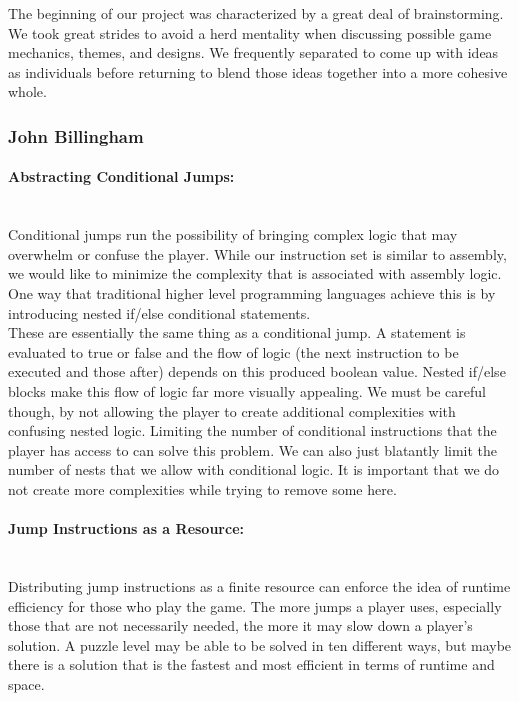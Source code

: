The beginning of our project was characterized by a great deal of brainstorming. We took great strides to avoid a herd mentality when discussing possible game mechanics, themes, and designs. We frequently separated to come up with ideas as individuals before returning to blend those ideas together into a more cohesive whole.

\subsubsection{John Billingham}
\paragraph{Abstracting Conditional Jumps:} ~\\
Conditional jumps run the possibility of bringing complex logic that may overwhelm or confuse the player. While our instruction set is similar to assembly, we would like to minimize the complexity that is associated with assembly logic. One way that traditional higher level programming languages achieve this is by introducing nested if/else conditional statements.\\

These are essentially the same thing as a conditional jump. A statement is evaluated to true or false and the flow of logic (the next instruction to be executed and those after) depends on this produced boolean value. Nested if/else blocks make this flow of logic far more visually appealing. We must be careful though, by not allowing the player to create additional complexities with confusing nested logic. Limiting the number of conditional instructions that the player has access to can solve this problem. We can also just blatantly limit the number of nests that we allow with conditional logic. It is important that we do not create more complexities while trying to remove some here.\\

\paragraph{Jump Instructions as a Resource:} ~\\
Distributing jump instructions as a finite resource can enforce the idea of runtime efficiency for those who play the game. The more jumps a player uses, especially those that are not necessarily needed, the more it may slow down a player's solution. A puzzle level may be able to be solved in ten different ways, but maybe there is a solution that is the fastest and most efficient in terms of runtime and space.\\

